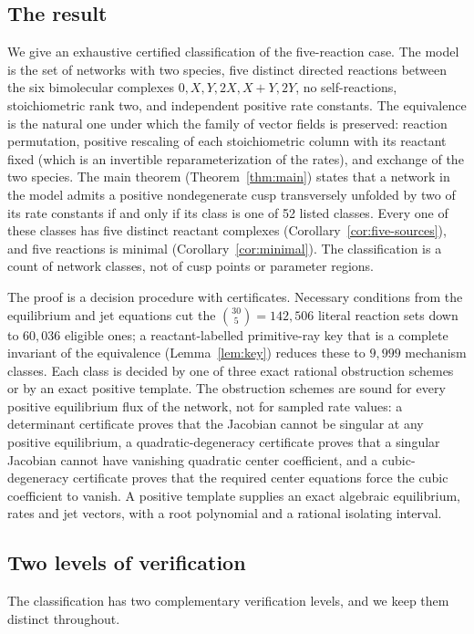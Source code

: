 \documentclass[11pt,a4paper]{article}
\theoremstyle{plain}
\theoremstyle{definition}
\theoremstyle{remark}
\numberwithin{equation}{section}
\begin{document}
\subsection{The result}
We give an exhaustive certified classification of the five-reaction case. The model is the set of networks with two species, five distinct directed reactions between the six bimolecular complexes $0,X,Y,2X,X+Y,2Y$, no self-reactions, stoichiometric rank two, and independent positive rate constants. The equivalence is the natural one under which the family of vector fields is preserved: reaction permutation, positive rescaling of each stoichiometric column with its reactant fixed (which is an invertible reparameterization of the rates), and exchange of the two species. The main theorem (Theorem~\ref{thm:main}) states that a network in the model admits a positive nondegenerate cusp transversely unfolded by two of its rate constants if and only if its class is one of 52 listed classes. Every one of these classes has five distinct reactant complexes (Corollary~\ref{cor:five-sources}), and five reactions is minimal (Corollary~\ref{cor:minimal}). The classification is a count of network classes, not of cusp points or parameter regions.

The proof is a decision procedure with certificates. Necessary conditions from the equilibrium and jet equations cut the $\binom{30}{5}=142{,}506$ literal reaction sets down to $60{,}036$ eligible ones; a reactant-labelled primitive-ray key that is a complete invariant of the equivalence (Lemma~\ref{lem:key}) reduces these to $9{,}999$ mechanism classes. Each class is decided by one of three exact rational obstruction schemes or by an exact positive template. The obstruction schemes are sound for every positive equilibrium flux of the network, not for sampled rate values: a determinant certificate proves that the Jacobian cannot be singular at any positive equilibrium, a quadratic-degeneracy certificate proves that a singular Jacobian cannot have vanishing quadratic center coefficient, and a cubic-degeneracy certificate proves that the required center equations force the cubic coefficient to vanish. A positive template supplies an exact algebraic equilibrium, rates and jet vectors, with a root polynomial and a rational isolating interval.

\subsection{Two levels of verification}
The classification has two complementary verification levels, and we keep them distinct throughout.
\end{document}
